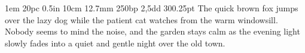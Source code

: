 \documentclass{article}
\begin{document}
 1em 20pc 0.5in 10cm 12.7mm 250bp 2,5dd 300.25pt The quick brown fox jumps over the lazy dog while the patient cat watches from the warm windowsill. Nobody seems to mind the noise, and the garden stays calm as the evening light slowly fades into a quiet and gentle night over the old town.
\end{document}

